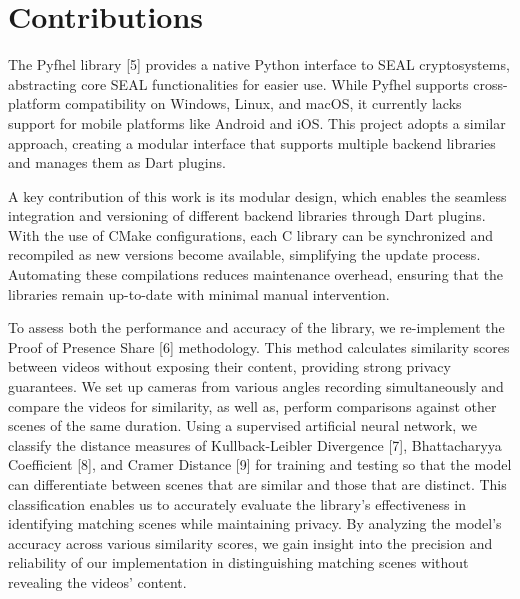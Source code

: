 \section{Contributions}
The Pyfhel library [5] provides a native Python interface to SEAL cryptosystems, abstracting core SEAL functionalities for easier use. While Pyfhel supports cross-platform compatibility on Windows, Linux, and macOS, it currently lacks support for mobile platforms like Android and iOS. This project adopts a similar approach, creating a modular interface that supports multiple backend libraries and manages them as Dart plugins.

A key contribution of this work is its modular design, which enables the seamless integration and versioning of different backend libraries through Dart plugins. With the use of CMake configurations, each C library can be synchronized and recompiled as new versions become available, simplifying the update process. Automating these compilations reduces maintenance overhead, ensuring that the libraries remain up-to-date with minimal manual intervention.

To assess both the performance and accuracy of the library, we re-implement the Proof of Presence Share [6] methodology. This method calculates similarity scores between videos without exposing their content, providing strong privacy guarantees. We set up cameras from various angles recording simultaneously and compare the videos for similarity, as well as, perform comparisons against other scenes of the same duration. Using a supervised artificial neural network, we classify the distance measures of Kullback-Leibler Divergence [7], Bhattacharyya Coefficient [8], and Cramer Distance [9] for training and testing so that the model can differentiate between scenes that are similar and those that are distinct. This classification enables us to accurately evaluate the library's effectiveness in identifying matching scenes while maintaining privacy. By analyzing the model’s accuracy across various similarity scores, we gain insight into the precision and reliability of our implementation in distinguishing matching scenes without revealing the videos’ content.
